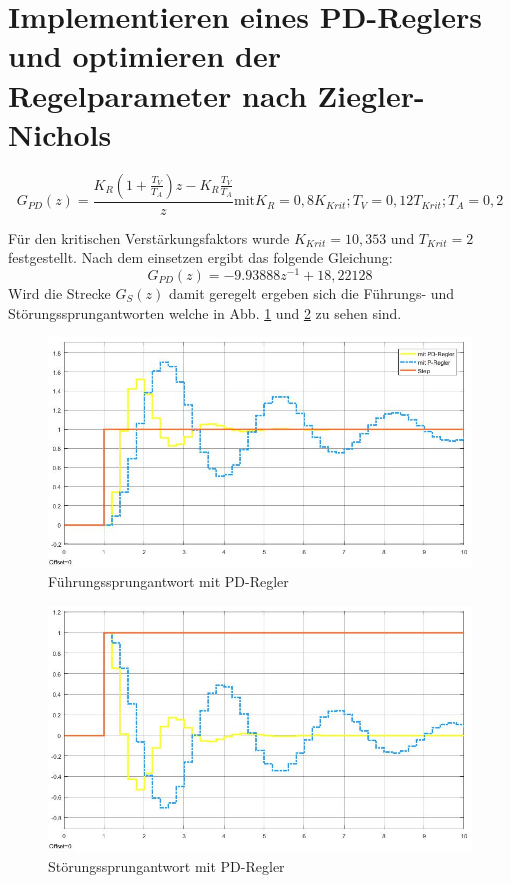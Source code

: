 \documentclass[12pt,a4paper]{article}
\begin{document}
\section{Implementieren eines PD-Reglers und optimieren der Regelparameter nach Ziegler-Nichols}

\begin{equation}
G_{PD}(z)= \frac{K_R\left(1+\frac{T_V}{T_A}\right)z-K_R\frac{T_V}{T_A}}{z} \text{mit} K_R = 0,8K_{Krit}; T_V= 0,12T_{Krit}; T_A=0,2
\end{equation}

Für den kritischen Verstärkungsfaktors wurde $K_{Krit}= 10,353$ und $T_{Krit}=2$ festgestellt. Nach dem einsetzen ergibt das folgende Gleichung:
\begin{equation}
G_{PD}(z) = -9.93888z^{-1}+18,22128
\end{equation}
Wird die Strecke $G_S(z)$ damit geregelt ergeben sich die Führungs- und Störungssprungantworten welche in Abb. \ref{fig:fuehrungssprungantwortpd} und \ref{fig:stoerungsssprungantwortpd} zu sehen sind.\\

\begin{figure}[h!]
\centering
\includegraphics[width=1\linewidth]{marius/V2/Fuehrungssprungantwort_PD}
\caption{Führungssprungantwort mit PD-Regler}
\label{fig:fuehrungssprungantwortpd}
\end{figure}

\begin{figure}[h!]
\centering
\includegraphics[width=1\linewidth]{marius/V2/Stoerungsssprungantwort_PD}
\caption{Störungssprungantwort mit PD-Regler}
\label{fig:stoerungsssprungantwortpd}
\end{figure}
\end{document}
